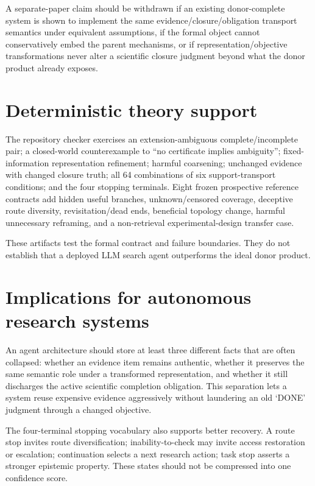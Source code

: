 \documentclass[11pt]{article}
\begin{document}
A separate-paper claim should be withdrawn if an existing donor-complete system is shown to implement the same evidence/closure/obligation transport semantics under equivalent assumptions, if the formal object cannot conservatively embed the parent mechanisms, or if representation/objective transformations never alter a scientific closure judgment beyond what the donor product already exposes.

\section{Deterministic theory support}
The repository checker exercises an extension-ambiguous complete/incomplete pair; a closed-world counterexample to ``no certificate implies ambiguity''; fixed-information representation refinement; harmful coarsening; unchanged evidence with changed closure truth; all 64 combinations of six support-transport conditions; and the four stopping terminals. Eight frozen prospective reference contracts add hidden useful branches, unknown/censored coverage, deceptive route diversity, revisitation/dead ends, beneficial topology change, harmful unnecessary reframing, and a non-retrieval experimental-design transfer case.

These artifacts test the formal contract and failure boundaries. They do not establish that a deployed LLM search agent outperforms the ideal donor product.

\section{Implications for autonomous research systems}
An agent architecture should store at least three different facts that are often collapsed: whether an evidence item remains authentic, whether it preserves the same semantic role under a transformed representation, and whether it still discharges the active scientific completion obligation. This separation lets a system reuse expensive evidence aggressively without laundering an old `DONE' judgment through a changed objective.

The four-terminal stopping vocabulary also supports better recovery. A route stop invites route diversification; inability-to-check may invite access restoration or escalation; continuation selects a next research action; task stop asserts a stronger epistemic property. These states should not be compressed into one confidence score.
\end{document}
